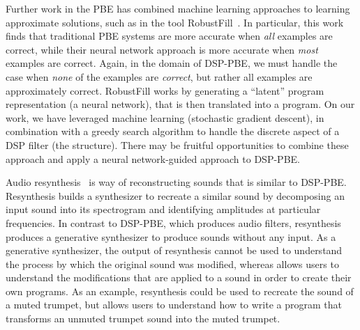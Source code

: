 Further work in the PBE has combined machine learning approaches to learning approximate solutions, such as in the tool RobustFill~\cite{devlin2017robustfill}.
In particular, this work finds that traditional PBE systems are more accurate when \textit{all} examples are correct, while their neural network approach is more accurate when \textit{most} examples are correct.
Again, in the domain of DSP-PBE, we must handle the case when \textit{none} of the examples are \textit{correct}, but rather all examples are approximately correct.
RobustFill works by generating a ``latent'' program representation (a neural network), that is then translated into a program.
On our work, we have leveraged machine learning (stochastic gradient descent), in combination with a greedy search algorithm to handle the discrete aspect of a DSP filter (the structure).
There may be fruitful opportunities to combine these approach and apply a neural network-guided approach to DSP-PBE.

Audio resynthesis~\cite{masri1996improved} is way of reconstructing sounds that is similar to DSP-PBE.
Resynthesis builds a synthesizer to recreate a similar sound by decomposing an input sound into its spectrogram and identifying amplitudes at particular frequencies.
In contrast to DSP-PBE, which produces audio filters, resynthesis produces a generative synthesizer to produce sounds without any input.
As a generative synthesizer, the output of resynthesis cannot be used to understand the process by which the original sound was modified, whereas \ourTool allows users to understand the modifications that are applied to a sound in order to create their own programs.
As an example, resynthesis could be used to recreate the sound of a muted trumpet, but \ourTool allows users to understand how to write a program that transforms an unmuted trumpet sound into the muted trumpet.
